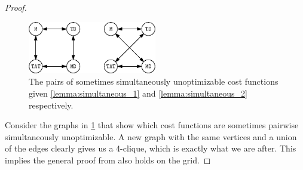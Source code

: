 \begin{proof}
	\begin{figure}[h]
		\centering
		\includegraphics[width=0.5\textwidth]{ipe/sim_thm.eps}
		\caption{
			The pairs of sometimes simultaneously unoptimizable cost functions given \cref{lemma:simultaneous_1} and \cref{lemma:simultaneous_2} respectively.
		}
		\label{fig:sim_separate}
	\end{figure}

	Consider the graphs in \cref{fig:sim_separate} that show which cost functions are sometimes pairwise simultaneously unoptimizable. 
	A new graph with the same vertices and a union of the edges clearly gives us a 4-clique, which is exactly what we are after. 
	This implies the general proof from \cite{corr/YuL15c} also holds on the grid.
\end{proof}


